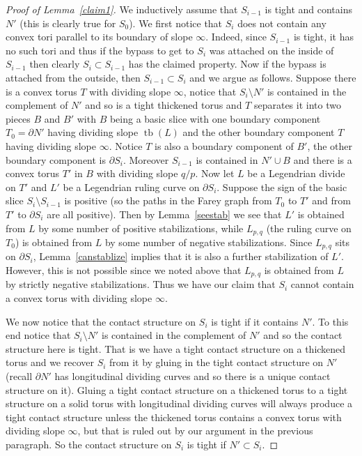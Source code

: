 \documentclass[11pt]{amsart}
\theoremstyle{plain}
\theoremstyle{definition}
\theoremstyle{remark}
\numberwithin{theorem}{section}
\DeclareMathOperator\tb{tb}                   %
\begin{document}
\begin{proof}[Proof of Lemma~\ref{claim1}]
We inductively assume that $S_{i-1}$ is tight and contains $N'$ (this is clearly true for $S_0$). We first notice that $S_i$ does not contain any convex tori parallel to its boundary of slope $\infty$. Indeed, since $S_{i-1}$ is tight, it has no such tori and thus if the bypass to get to $S_i$ was attached on the inside of $S_{i-1}$ then clearly $S_i\subset S_{i-1}$ has the claimed property. Now if the bypass is attached from the outside, then $S_{i-1}\subset S_i$ and we argue as follows. Suppose there is a convex torus $T$ with dividing slope $\infty$, notice that $S_i\setminus N'$ is contained in the complement of $N'$ and so is a tight thickened torus and $T$ separates it into two pieces $B$ and $B'$ with $B$ being a basic slice with one boundary component $T_0=\partial N'$ having dividing slope $\tb(L)$ and the other boundary component $T$ having dividing slope $\infty$. Notice $T$ is also a boundary component of $B'$, the other boundary component is $\partial S_i$. Moreover $S_{i-1}$ is contained in $N'\cup B$ and there is a convex torus $T'$ in $B$ with dividing slope $q/p$. Now let $L$ be a Legendrian divide on $T'$ and $L'$ be a Legendrian ruling curve on $\partial S_i$.  Suppose the sign of the basic slice $S_i\setminus S_{i-1}$ is positive (so the paths in the Farey graph from $T_0$ to $T'$ and from $T'$ to $\partial S_i$ are all positive). Then by Lemma~\ref{seestab} we see that $L'$ is obtained from $L$ by some number of positive stabilizations, while $L_{p,q}$ (the ruling curve on $T_0$) is obtained from $L$ by some number of negative stabilizations. Since $L_{p,q}$ sits on $\partial S_i$, Lemma~\ref{canstablize} implies that it is also a further stabilization of $L'$. However, this is not possible since we noted above that $L_{p,q}$ is obtained from $L$ by strictly negative stabilizations. Thus we have our claim that $S_i$ cannot contain a convex torus with dividing slope $\infty$.  

We now notice that the contact structure on $S_i$ is tight if it contains $N'$. To this end notice that $S_i\setminus N'$ is contained in the complement of $N'$ and so the contact structure here is tight. That is we have a tight contact structure on a thickened torus and we recover $S_i$ from it by gluing in the tight contact structure on $N'$ (recall $\partial N'$ has longitudinal dividing curves and so there is a unique contact structure on it). Gluing a tight contact structure on a thickened torus to a tight structure on a solid torus with longitudinal dividing curves will always produce a tight contact structure unless the thickened torus contains a convex torus with dividing slope $\infty$, but that is ruled out by our argument in the previous paragraph. So the contact structure on $S_i$ is tight if $N'\subset S_i$. 


\end{proof}
\end{document}
